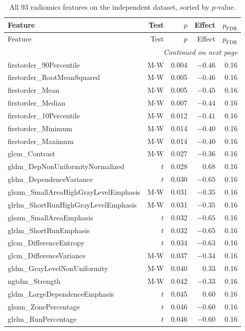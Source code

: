 \begin{appendices}
\small
\begin{longtable}{p{6.5cm}rrrr}
\caption{All 93 radiomics features on the independent dataset, sorted by $p$-value.} \label{tab:full_features} \\
\toprule
Feature & Test & $p$ & Effect & $p_{\text{FDR}}$ \\
\midrule
\endfirsthead
\toprule
Feature & Test & $p$ & Effect & $p_{\text{FDR}}$ \\
\midrule
\endhead
\midrule
\multicolumn{5}{r}{\textit{Continued on next page}} \\
\endfoot
\bottomrule
\endlastfoot
firstorder\_90Percentile & M-W & 0.004 & $-0.46$ & 0.16 \\
firstorder\_RootMeanSquared & M-W & 0.005 & $-0.46$ & 0.16 \\
firstorder\_Mean & M-W & 0.005 & $-0.45$ & 0.16 \\
firstorder\_Median & M-W & 0.007 & $-0.44$ & 0.16 \\
firstorder\_10Percentile & M-W & 0.012 & $-0.41$ & 0.16 \\
firstorder\_Minimum & M-W & 0.014 & $-0.40$ & 0.16 \\
firstorder\_Maximum & M-W & 0.014 & $-0.40$ & 0.16 \\
glcm\_Contrast & M-W & 0.027 & $-0.36$ & 0.16 \\
gldm\_DepNonUniformityNormalized & $t$ & 0.028 & 0.68 & 0.16 \\
gldm\_DependenceVariance & $t$ & 0.030 & $-0.65$ & 0.16 \\
glszm\_SmallAreaHighGrayLevelEmphasis & M-W & 0.031 & $-0.35$ & 0.16 \\
glrlm\_ShortRunHighGrayLevelEmphasis & M-W & 0.031 & $-0.35$ & 0.16 \\
glszm\_SmallAreaEmphasis & $t$ & 0.032 & $-0.65$ & 0.16 \\
glrlm\_ShortRunEmphasis & $t$ & 0.032 & $-0.65$ & 0.16 \\
glcm\_DifferenceEntropy & $t$ & 0.034 & $-0.63$ & 0.16 \\
glcm\_DifferenceVariance & M-W & 0.037 & $-0.34$ & 0.16 \\
gldm\_GrayLevelNonUniformity & M-W & 0.040 & 0.33 & 0.16 \\
ngtdm\_Strength & M-W & 0.042 & $-0.33$ & 0.16 \\
gldm\_LargeDependenceEmphasis & $t$ & 0.045 & 0.60 & 0.16 \\
glszm\_ZonePercentage & $t$ & 0.046 & $-0.60$ & 0.16 \\
glrlm\_RunPercentage & $t$ & 0.046 & $-0.60$ & 0.16 \\

\end{longtable}
\end{appendices}

